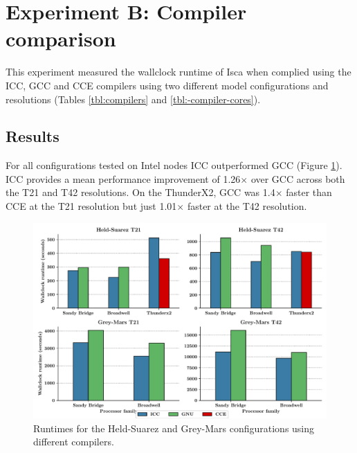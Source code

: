 \documentclass[a4paper,11pt]{report}
\begin{document}
%
%
%
%



\section{Experiment B: Compiler comparison}
This experiment measured the wallclock runtime of Isca when complied using the ICC, GCC and CCE compilers using two different model configurations and resolutions (Tables \ref{tbl:compilers} and \ref{tbl:-compiler-cores}). 

\subsection{Results}
For all configurations tested on Intel nodes ICC outperformed GCC (Figure \ref{fig:compiler-comparison-t42}). ICC provides a mean performance improvement of 1.26$\times$ over GCC across both the T21 and T42 resolutions. On the ThunderX2, GCC was 1.4$\times$ faster than CCE at the T21 resolution but just 1.01$\times$ faster at the T42 resolution.


\par
\begin{figure}[htbp]
\begin{center}
\includegraphics[width=1\textwidth]{img/compiler-comparison.pdf}
\caption[Performance comparison using different compilers]{Runtimes for the Held-Suarez and Grey-Mars configurations using different compilers.}
\label{fig:compiler-comparison-t42}
\end{center}
\end{figure}
\end{document}
